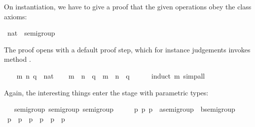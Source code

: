 \begin{isabellebody}
\begin{isamarkuptext}
On instantiation, we have to give a proof that the given operations
obey the class axioms:%
\end{isamarkuptext}%
\isamarkuptrue%
\isamarkupfalse%
\ nat\ {\isacharcolon}{\isacharcolon}\ semigroup\isanewline
{}\isanewline
\isanewline
{}\isamarkupfalse%
%
\isadelimproof
\ %
\endisadelimproof
%
\isatagproof
{}\isamarkupfalse%
%
\begin{isamarkuptxt}%
\noindent The proof opens with a default proof step, which for
instance judgements invokes method \hyperlink{method.intro-classes}{\mbox{}}.%
\end{isamarkuptxt}%
\isamarkuptrue%
\ \ \isamarkupfalse%
\ m\ n\ q\ {\isacharcolon}{\isacharcolon}\ nat\isanewline
\ \ \isamarkupfalse%
\ {\isachardoublequoteopen}{\isacharparenleft}m\ {\isasymoplus}\ n{\isacharparenright}\ {\isasymoplus}\ q\ {\isacharequal}\ m\ {\isasymoplus}\ {\isacharparenleft}n\ {\isasymoplus}\ q{\isacharparenright}{\isachardoublequoteclose}\isanewline
\ \ \ \ \isamarkupfalse%
\ {\isacharparenleft}induct\ m{\isacharparenright}\ simp{\isacharunderscore}all\isanewline
{}\isamarkupfalse%
%
\endisatagproof
{\isafoldproof}%
%
\isadelimproof
%
\endisadelimproof
\isanewline
\isanewline
{}\isamarkupfalse%
%
\begin{isamarkuptext}%
\noindent Again, the interesting things enter the stage with
parametric types:%
\end{isamarkuptext}%
\isamarkuptrue%
\isamarkupfalse%
\ {\isacharasterisk}\ {\isacharcolon}{\isacharcolon}\ {\isacharparenleft}semigroup{\isacharcomma}\ semigroup{\isacharparenright}\ semigroup\isanewline
{}\isanewline
\isanewline
{}\isamarkupfalse%
%
\isadelimproof
\ %
\endisadelimproof
%
\isatagproof
{}\isamarkupfalse%
\isanewline
\ \ \isamarkupfalse%
\ p\ p\ p\ {\isacharcolon}{\isacharcolon}\ {\isachardoublequoteopen}{\isacharprime}a{\isasymColon}semigroup\ {\isasymtimes}\ {\isacharprime}b{\isasymColon}semigroup{\isachardoublequoteclose}\isanewline
\ \ \isamarkupfalse%
\ {\isachardoublequoteopen}p\ {\isasymoplus}\ p\ {\isasymoplus}\ p\ {\isacharequal}\ p\ {\isasymoplus}\ {\isacharparenleft}p\ {\isasymoplus}\ p\isanewline

\end{isabellebody}
